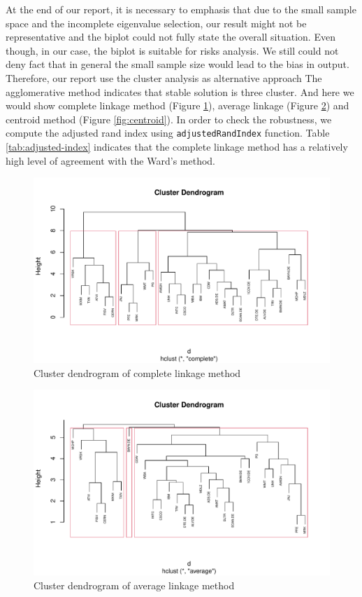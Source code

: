 \documentclass[11pt,a4paper,]{article}
\begin{document}
At the end of our report, it is necessary to emphasis that due to the small sample space and the incomplete eigenvalue selection, our result might not be representative and the biplot could not fully state the overall situation. Even though, in our case, the biplot is suitable for risks analysis. We still could not deny fact that in general the small sample size would lead to the bias in output. Therefore, our report use the cluster analysis as alternative approach The agglomerative method indicates that stable solution is three cluster. And here we would show complete linkage method (Figure \ref{fig:complete}), average linkage (Figure \ref{fig:average}) and centroid method (Figure \ref{fig:centroid}). In order to check the robustness, we compute the adjusted rand index using \texttt{adjustedRandIndex} function. Table \ref{tab:adjusted-index} indicates that the complete linkage method has a relatively high level of agreement with the Ward's method.

\begin{figure}
\centering
\includegraphics{ass2_files/figure-latex/complete-1.pdf}
\caption{\label{fig:complete}Cluster dendrogram of complete linkage method}
\end{figure}

\begin{figure}
\centering
\includegraphics{ass2_files/figure-latex/average-1.pdf}
\caption{\label{fig:average}Cluster dendrogram of average linkage method}
\end{figure}
\end{document}
